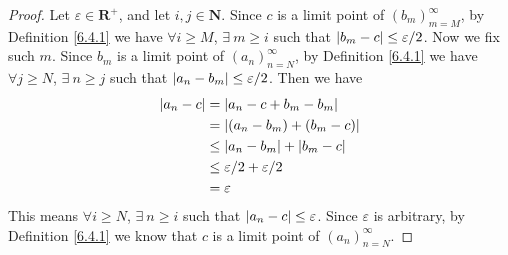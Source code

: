 \begin{proof}
    Let \(\varepsilon \in \mathbf{R}^+\), and let \(i, j \in \mathbf{N}\).
    Since \(c\) is a limit point of \((b_m)_{m = M}^\infty\), by Definition \ref{6.4.1} we have \(\forall i \geq M\), \(\exists\ m \geq i\) such that \(\abs*{b_m - c} \leq \varepsilon / 2\).
    Now we fix such \(m\).
    Since \(b_m\) is a limit point of \((a_n)_{n = N}^\infty\), by Definition \ref{6.4.1} we have \(\forall j \geq N\), \(\exists\ n \geq j\) such that \(\abs*{a_n - b_m} \leq \varepsilon / 2\).
    Then we have
    \begin{align*}
        \abs*{a_n - c} & = \abs*{a_n - c + b_m - b_m}           \\
                       & = \abs*{(a_n - b_m) + (b_m - c)}       \\
                       & \leq \abs*{a_n - b_m} + \abs*{b_m - c} \\
                       & \leq \varepsilon / 2 + \varepsilon / 2 \\
                       & = \varepsilon
    \end{align*}
    This means \(\forall i \geq N\), \(\exists\ n \geq i\) such that \(\abs*{a_n - c} \leq \varepsilon\).
    Since \(\varepsilon\) is arbitrary, by Definition \ref{6.4.1} we know that \(c\) is a limit point of \((a_n)_{n = N}^\infty\).
\end{proof}